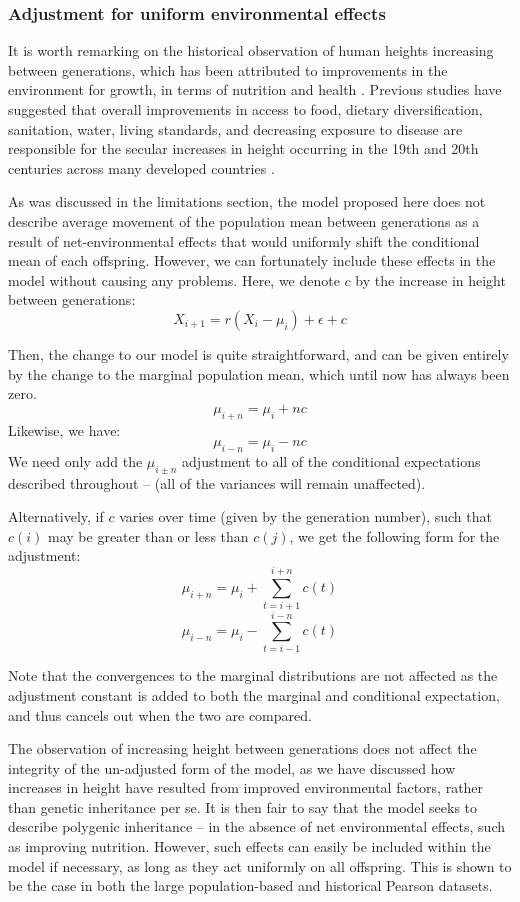 \documentclass[letterpaper,10pt]{article} %
\begin{document}
\subsubsection*{Adjustment for uniform environmental effects}
It is worth remarking on the historical observation of human heights increasing between generations, which has been attributed to improvements in the environment for growth, in terms of nutrition and health \cite{bogin}. Previous studies have suggested that overall improvements in access to food, dietary diversification, sanitation, water, living standards, and decreasing exposure to disease are responsible for the secular increases in height occurring in the 19th and 20th centuries across many developed countries \cite{perkins}. 

As was discussed in the limitations section, the model proposed here does not describe average movement of the population mean between generations as a result of net-environmental effects that would uniformly shift the conditional mean of each offspring. However, we can fortunately include these effects in the model without causing any problems. Here, we denote $c$ by the increase in height between generations:
$$X_{i+1} = r(X_i - \mu_i) + \epsilon + c$$

Then, the change to our model is quite straightforward, and can be given entirely by the change to the marginal population mean, which until now has always been zero.
$$\mu_{i+n} = \mu_i + nc$$
Likewise, we have:
$$\mu_{i-n} = \mu_i - nc$$
We need only add the $\mu_{i \pm n}$ adjustment to all of the conditional expectations described throughout -- (all of the variances will remain unaffected). 

Alternatively, if $c$ varies over time (given by the generation number), such that $c(i)$ may be greater than or less than $c(j)$, we get the following form for the adjustment:
$$\mu_{i+n} = \mu_i + \sum_{t = i+1}^{i+n} c(t)$$
$$\mu_{i-n} = \mu_i - \sum_{t = i-1}^{i-n} c(t)$$

Note that the convergences to the marginal distributions are not affected as the adjustment constant is added to both the marginal and conditional expectation, and thus cancels out when the two are compared. 

The observation of increasing height between generations does not affect the integrity of the un-adjusted form of the model, as we have discussed how increases in height have resulted from improved environmental factors, rather than genetic inheritance per se. It is then fair to say that the model seeks to describe polygenic inheritance -- in the absence of net environmental effects, such as improving nutrition. However, such effects can easily be included within the model if necessary, as long as they act uniformly on all offspring. This is shown to be the case in both the large population-based and historical Pearson datasets. 
\end{document}
